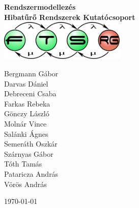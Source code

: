 \begin{titlepage}
\begin{center}
\vspace*{5cm}

{\huge \bfseries Rendszermodellezés}\\[0.8cm]

{\Large \bfseries Hibatűrő Rendszerek Kutatócsoport}\\[0.8cm]

\includegraphics[width=60mm,keepaspectratio]{figures/ftsrg-logo}\\

\vfill

Bergmann Gábor \\
Darvas Dániel \\
Debreceni Csaba \\
Farkas Rebeka \\
Gönczy László \\
Molnár Vince \\
Salánki Ágnes \\
Semeráth Oszkár \\
Szárnyas Gábor \\
Tóth Tamás \\
Pataricza András \\
Vörös András

\vfill

{\large \today}

\vspace{3cm}
\end{center}
\end{titlepage}
